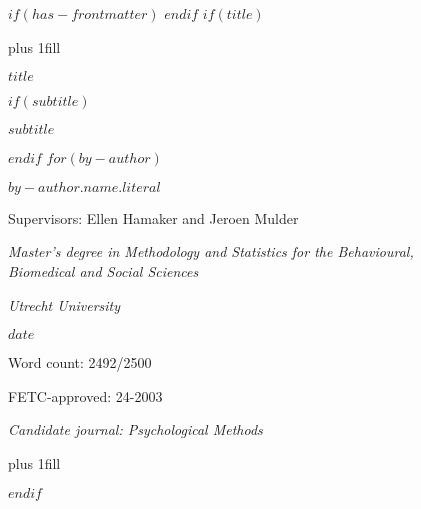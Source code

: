 $if(has-frontmatter)$
\frontmatter
$endif$
$if(title)$
\cleardoublepage
\thispagestyle{empty}
{\centering
\hbox{}\vskip 0cm plus 1fill
{\Large\bfseries $title$ \par}
$if(subtitle)$
\vspace{3ex}
{\large $subtitle$ \par}
$endif$
\vspace{9ex}
$for(by-author)$
{\large\bfseries $by-author.name.literal$ \par}
\vspace{3ex}
{\large Supervisors: Ellen Hamaker and Jeroen Mulder \par}
\vspace{9ex}
{\normalsize \textit{Master's degree in Methodology and Statistics for the Behavioural, \\ Biomedical and Social Sciences} \par}
\vspace{3ex}
{\normalsize \textit{Utrecht University} \par}
\vspace{9ex}
{\normalsize $date$ \par}
\vspace{3ex}
{\normalsize Word count: 2492/2500 \par}
\vspace{9ex}
{\normalsize FETC-approved: 24-2003 \par}
\vspace{9ex}
{\normalsize \textit{Candidate journal: Psychological Methods} \par}
\hbox{}\vskip 0cm plus 1fill
}
$endif$
